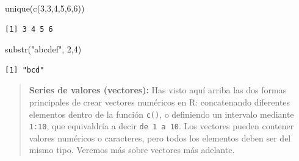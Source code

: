 \documentclass[
  letterpaper,
  DIV=11,
  numbers=noendperiod]{scrreprt}
\newenvironment{Shaded}{\begin{snugshade}}{\end{snugshade}}
\newcommand{\DecValTok}[1]{\textcolor[rgb]{0.68,0.00,0.00}{#1}}
\newcommand{\FunctionTok}[1]{\textcolor[rgb]{0.28,0.35,0.67}{#1}}
\newcommand{\NormalTok}[1]{\textcolor[rgb]{0.00,0.23,0.31}{#1}}
\newcommand{\StringTok}[1]{\textcolor[rgb]{0.13,0.47,0.30}{#1}}
\begin{document}
\begin{Shaded}
\begin{Highlighting}[]
\FunctionTok{unique}\NormalTok{(}\FunctionTok{c}\NormalTok{(}\DecValTok{3}\NormalTok{,}\DecValTok{3}\NormalTok{,}\DecValTok{4}\NormalTok{,}\DecValTok{5}\NormalTok{,}\DecValTok{6}\NormalTok{,}\DecValTok{6}\NormalTok{))}
\end{Highlighting}
\end{Shaded}

\begin{verbatim}
[1] 3 4 5 6
\end{verbatim}

\begin{Shaded}
\begin{Highlighting}[]
\FunctionTok{substr}\NormalTok{(}\StringTok{"abcdef"}\NormalTok{, }\DecValTok{2}\NormalTok{,}\DecValTok{4}\NormalTok{)}
\end{Highlighting}
\end{Shaded}

\begin{verbatim}
[1] "bcd"
\end{verbatim}

\begin{quote}
\textbf{Series de valores (vectores):} Has visto aquí arriba las dos
formas principales de crear vectores numéricos en R: concatenando
diferentes elementos dentro de la función \texttt{c()}, o definiendo un
intervalo mediante \texttt{1:10}, que equivaldría a decir
\texttt{de\ 1\ a\ 10}. Los vectores pueden contener valores numéricos o
caracteres, pero todos los elementos deben ser del mismo tipo. Veremos
más sobre vectores más adelante.
\end{quote}
\end{document}
